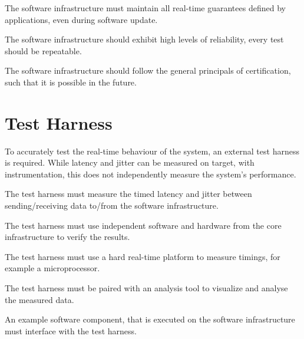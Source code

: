\begin{srsitems}
    \item The software infrastructure must maintain all real-time guarantees defined by applications, even during software update.

    \item The software infrastructure should exhibit high levels of reliability, every test should be repeatable.
    
    \item The software infrastructure should follow the general principals of certification, such that it is possible in the future.



\section{Test Harness}

To accurately test the real-time behaviour of the system, an external test harness is required. While latency and jitter can be measured on target, with instrumentation, this does not independently measure the system's performance.



    \item The test harness must measure the timed latency and jitter between sending/receiving data to/from the software infrastructure.
    \begin{srsitems} 
        \item The test harness must use independent software and hardware from the core infrastructure to verify the results.
        \item The test harness must use a hard real-time platform to measure timings, for example a microprocessor.
        \item The test harness must be paired with an analysis tool to visualize and analyse the measured data.
    \end{srsitems}

    \item An example software component, that is executed on the software infrastructure must interface with the test harness.
\end{srsitems}

